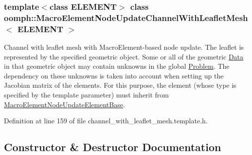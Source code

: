 \subsubsection*{template$<$class E\+L\+E\+M\+E\+NT$>$\newline
class oomph\+::\+Macro\+Element\+Node\+Update\+Channel\+With\+Leaflet\+Mesh$<$ E\+L\+E\+M\+E\+N\+T $>$}

Channel with leaflet mesh with Macro\+Element-\/based node update. The leaflet is represented by the specified geometric object. Some or all of the geometric \hyperlink{classoomph_1_1Data}{Data} in that geometric object may contain unknowns in the global \hyperlink{classoomph_1_1Problem}{Problem}. The dependency on these unknowns is taken into account when setting up the Jacobian matrix of the elements. For this purpose, the element (whose type is specified by the template parameter) must inherit from \hyperlink{classoomph_1_1MacroElementNodeUpdateElementBase}{Macro\+Element\+Node\+Update\+Element\+Base}. 

Definition at line 159 of file channel\+\_\+with\+\_\+leaflet\+\_\+mesh.\+template.\+h.



\subsection{Constructor \& Destructor Documentation}
\mbox{\label{classoomph_1_1MacroElementNodeUpdateChannelWithLeafletMesh_a8b2ddfc283a8f1ff6927c7a0c7f0ed21}} 
